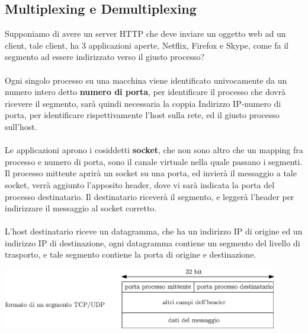 \documentclass[12pt, letterpaper]{article}
\newcommand{\acc}{\\\hphantom{}\\}
\begin{document}
\subsection{Multiplexing e Demultiplexing}
Supponiamo di avere un server HTTP che deve inviare un oggetto web ad un client, tale client, ha 3 applicazioni
aperte, Netflix, Firefox e Skype, come fa il segmento ad essere indirizzato verso il giusto processo?\acc
Ogni singolo processo su una macchina viene identificato univocamente da un numero intero detto \textbf{numero
    di porta}, per identificare il processo che dovrà ricevere il segmento, sarà quindi necessaria
la coppia Indirizzo IP-numero di porta, per identificare rispettivamente l'host sulla rete, ed il giusto
processo sull'host.\acc
Le applicazioni aprono i cosiddetti \textbf{socket}, che non sono altro che un mapping fra
processo e numero di porta, sono il canale virtuale nella quale passano i segmenti. Il processo
mittente aprirà un socket su una porta, ed invierà il messaggio a tale socket, verrà aggiunto l'apposito
header, dove vi sarà indicata la porta del processo destinatario. Il destinatario riceverà il segmento, e leggerà l'header
per indirizzare il messaggio al socket corretto.\acc
L'host destinatario riceve un datagramma, che ha un indirizzo IP di origine ed un indirizzo IP di
destinazione, ogni datagramma contiene un segmento del livello di trasporto, e tale segmento contiene la
porta di origine e destinazione.\begin{center}
    \includegraphics[width=0.9\textwidth ]{images/segmento.eps}
\end{center}
\end{document}
